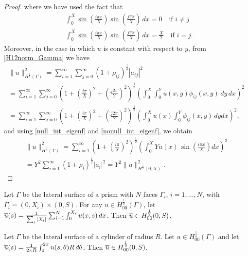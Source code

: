 \documentclass[r]{siamart171218}
\begin{document}
\begin{proof}
where we have used the fact that
\begin{eqnarray*}
&\int_0^X \sin\left(\frac{i\pi x}{X}\right) \sin\left(\frac{j\pi x}{X}\right)\, dx=0 \quad \text{if $i\neq j$}\\
&\int_0^X \sin\left(\frac{i\pi x}{X}\right) \sin\left(\frac{j\pi x}{X}\right)\, dx=\frac X2 \quad \text{if $i =j$}.
\end{eqnarray*}
Moreover, in the case in which $u$ is constant with respect to $y$, from \eqref{H12norm_Gamma} we have
\begin{multline*}
\|u\|^2_{H^{\frac 12}(\Gamma)}=\sum_{i=1}^{\infty}\sum_{j=0}^{\infty} \left( 1+ \rho_{ij}\right)^{\frac 12}|a_{ij}|^2\\
=\sum_{i=1}^{\infty}\sum_{j=0}^{\infty} \left(  1+ \left(\frac{i\pi}{X}\right)^2 + \left(\frac{j2\pi}{Y}\right)^2\right)^{\frac 12}\left( \int _0^X\int _0^Y u(x,y )\phi_{ij}(x,y) \,dy\,dx \right)^2\\
=\sum_{i=1}^{\infty}\sum_{j=0}^{\infty} \left(  1+ \left(\frac{i\pi}{X}\right)^2 + \left(\frac{j2\pi}{Y}\right)^2\right)^{\frac 12}\left( \int _0^X u(x) \int _0^Y \phi_{ij}(x,y)\,  dy dx \right)^2,
\end{multline*}
and using \eqref{null_int_eigenf} and \eqref{nonull_int_eigenf}, we obtain
\begin{multline*}
\|u\|^2_{H^{\frac 12}(\Gamma)}=
\sum_{i=1}^{\infty}\left( 1+ \left(\frac{i\pi}{X}\right)^2\right)^{\frac 12}\left(\int _0^X Yu(x)\, \sin\left(\frac{i\pi x}{X}\right) dx\right)^2\\
=Y^2 \sum_{i=1}^{\infty}\left( 1+ \rho _i\right)^{\frac 12}|a_i|^2 = Y^2  \|u\|^2_{H^{\frac 12}(0,X)}.
\end{multline*}
\end{proof}

\begin{corollary}
Let $\Gamma$ be the lateral surface of a prism with $N$ faces $\Gamma_i$, $i=1, \dots, N$, with $\Gamma_i=(0,X_i)\times(0,S)$. For any $u\in H^{\frac 12}_{00}(\Gamma)$, let $\overline{u}(s)= \frac{1}{\sum_i{|X_i|}}\sum_{i=1}^N \int_0^{X_i} u(x,s)\, dx$. Then $\overline{u}\in H^{\frac 12}_{00}(0,S)$.
\end{corollary}

\begin{corollary}
Let $\Gamma$ be the lateral surface of a cylinder of radius $R$. Let $u\in H^{\frac 12}_{00}(\Gamma)$ and let $\overline{u}(s)= \frac{1}{2\pi R} \int_0^{2\pi} u(s,\theta)R\, d\theta$. Then $\overline{u}\in H^{\frac 12}_{00}(0,S)$.
\end{corollary}
\end{document}
